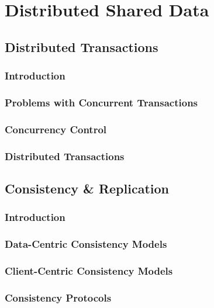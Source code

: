 \section{Distributed Shared Data}

\subsection{Distributed Transactions}

\subsubsection*{Introduction}

\subsubsection*{Problems with Concurrent Transactions}

\subsubsection*{Concurrency Control}

\subsubsection*{Distributed Transactions}

\subsection{Consistency \& Replication}

\subsubsection*{Introduction}

\subsubsection*{Data-Centric Consistency Models}

\subsubsection*{Client-Centric Consistency Models}

\subsubsection*{Consistency Protocols}
